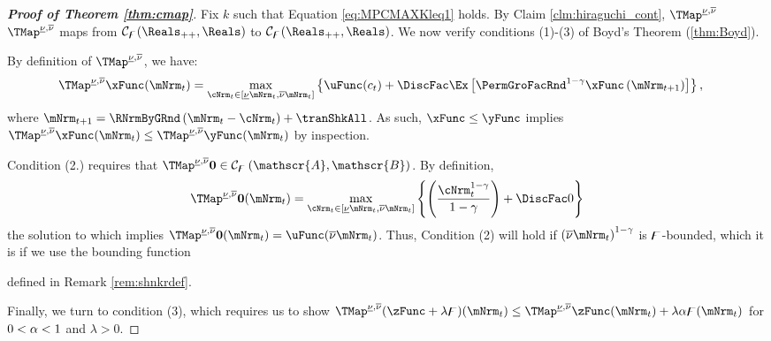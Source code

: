 \documentclass[\econtexRoot/BufferStockTheory]{subfiles}
\begin{document}
\begin{proof}[\textbf{Proof of Theorem \ref{thm:cmap}}]
Fix $k$ such that Equation \eqref{eq:MPCMAXKleq1} holds.
By Claim \ref{clm:hiraguchi_cont}, $\TMap^{\MPCminInf, \MPCmaxInf}$  $\TMap^{\MPCminInf, \MPCmaxInf}$ maps from $\mathcal{C}_{\boundFunc}(\Reals_{++},\Reals)$ to $\mathcal{C}_{\boundFunc}(\Reals_{++},\Reals)$.
We now verify conditions (1)-(3) of Boyd's Theorem (\ref{thm:Boyd}).


 By definition of $\TMap^{\MPCminInf, \MPCmaxInf}$, we have: 
\begin{equation}\begin{gathered}\begin{aligned}
  \TMap^{\MPCminInf, \MPCmaxInf}{\mathfrak{\xFunc}}(\mNrm_{t}) & = \underset{\cNrm_{t} \in
                                            [\MPCminInf \mNrm_{t}, \MPCmaxInf \mNrm_{t}]
                                            }\max \left\{
                                            \uFunc(c_{t})+\DiscFac \Ex\left[ {\PermGroFacRnd}^{1-\CRRA }{\mathfrak{\xFunc}}
                                            \left( {\mNrm}_{t+1}\right) \right] \right\},    \label{eq:condition1}
\end{aligned}\end{gathered}\end{equation}%
%
where ${\mNrm}_{t+1} = \RNrmByGRnd\left(\mNrm_{t} - \cNrm_{t}\right) + \tranShkAll$.
As such, ${\mathfrak{\xFunc}} \leq {\mathfrak{\yFunc}}$ implies $\TMap^{\MPCminInf, \MPCmaxInf}{\mathfrak{\xFunc}}(\mNrm_{t}) \leq \TMap^{\MPCminInf, \MPCmaxInf}{\mathfrak{\yFunc}} (\mNrm_{t})$ by inspection.

  Condition (2.) requires that $\TMap^{\MPCminInf, \MPCmaxInf}\mathbf{0}\in \mathcal{C}_{\boundFunc}\left(\mathscr{A},\mathscr{B}\right)$.
By definition,
\begin{equation*}
  \TMap^{\MPCminInf, \MPCmaxInf} \mathbf{0}(\mNrm_{t}) = \max_{\cNrm_{t} \in
    [\MPCminInf \mNrm_{t}, \MPCmaxInf \mNrm_{t}]
  }\left\{ \left( \frac{\cNrm_{t}^{1-\CRRA }}{1-\CRRA }\right) +\DiscFac 0\right\}
\end{equation*}
the solution to which implies
$\TMap^{\MPCminInf, \MPCmaxInf} \mathbf{0}(\mNrm_{t}) = \uFunc(\MPCmaxInf \mNrm_{t})$.
Thus, Condition (2)
will hold if ${(\MPCmaxInf \mNrm_{t})}^{1-\CRRA}$ is $\digamma$-bounded, which it is if we use the
bounding function

defined in Remark \ref{rem:shnkrdef}.


 Finally, we turn to condition (3), which requires us to show $\TMap^{\MPCminInf, \MPCmaxInf}({\zFunc} +\lambda\boundFunc
)(\mNrm_{t}) \leq\TMap^{\MPCminInf, \MPCmaxInf}{\zFunc}(\mNrm_{t}) +\lambda \Shrinker
\boundFunc(\mNrm_{t})$ for $0<\alpha<1$ and $\lambda>0$.


\end{proof}
\end{document}
